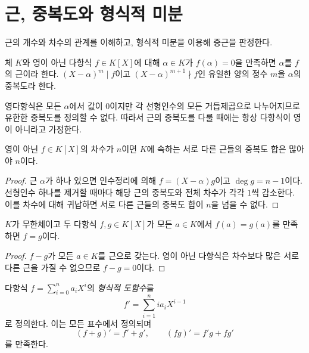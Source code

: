 \section{근, 중복도와 형식적 미분}
\label{sec:roots-derivatives}

\begin{learninggoal}
근의 개수와 차수의 관계를 이해하고, 형식적 미분을 이용해 중근을 판정한다.
\end{learninggoal}

\begin{definition}
체 $K$와 영이 아닌 다항식 $f\in K[X]$에 대해 $\alpha\in K$가 $f(\alpha)=0$을 만족하면 $\alpha$를 $f$의 근이라 한다. $(X-\alpha)^m\mid f$이고 $(X-\alpha)^{m+1}\nmid f$인 유일한 양의 정수 $m$을 $\alpha$의 중복도라 한다.
\end{definition}

영다항식은 모든 $\alpha$에서 값이 $0$이지만 각 선형인수의 모든 거듭제곱으로 나누어지므로 유한한 중복도를 정의할 수 없다. 따라서 근의 중복도를 다룰 때에는 항상 다항식이 영이 아니라고 가정한다.

\begin{theorem}[근의 개수 정리]
영이 아닌 $f\in K[X]$의 차수가 $n$이면 $K$에 속하는 서로 다른 근들의 중복도 합은 많아야 $n$이다.
\end{theorem}

\begin{proof}
근 $\alpha$가 하나 있으면 인수정리에 의해 $f=(X-\alpha)g$이고 $\deg g=n-1$이다. 선형인수 하나를 제거할 때마다 해당 근의 중복도와 전체 차수가 각각 $1$씩 감소한다. 이를 차수에 대해 귀납하면 서로 다른 근들의 중복도 합이 $n$을 넘을 수 없다.
\end{proof}

\begin{corollary}
$K$가 무한체이고 두 다항식 $f,g\in K[X]$가 모든 $a\in K$에서 $f(a)=g(a)$를 만족하면 $f=g$이다.
\end{corollary}

\begin{proof}
$f-g$가 모든 $a\in K$를 근으로 갖는다. 영이 아닌 다항식은 차수보다 많은 서로 다른 근을 가질 수 없으므로 $f-g=0$이다.
\end{proof}

\begin{definition}
다항식 $f=\sum_{i=0}^n a_iX^i$의 \emph{형식적 도함수}를
\[
 f'=\sum_{i=1}^n ia_iX^{i-1}
\]
로 정의한다. 이는 모든 표수에서 정의되며
\[
 (f+g)'=f'+g',\qquad (fg)'=f'g+fg'
\]
를 만족한다.
\end{definition}


